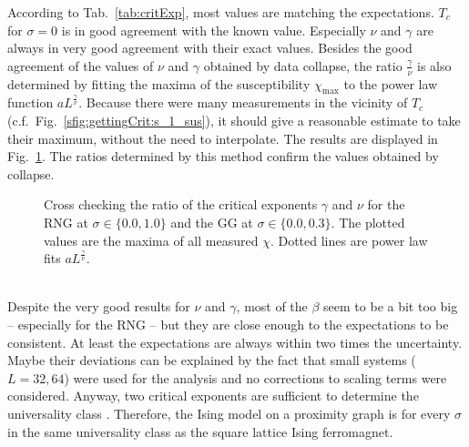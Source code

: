     According to Tab.\ \ref{tab:critExp}, most values
    are matching the expectations. \(T_c\) for \(\sigma = 0\) is in good
    agreement with the known value. Especially \(\nu\) and \(\gamma\)
    are always in very good agreement with their exact values. Besides the
    good agreement of the values of \(\nu\) and \(\gamma\) obtained by data collapse,
    the ratio \(\frac{\gamma}{\nu}\) is also determined by fitting the maxima of
    the susceptibility \(\chi_{\mathrm{max}}\) to the power law function \(aL^\frac{\gamma}{\nu}\).
    Because there were many measurements in the vicinity of \(T_c\)
    (c.f.\ Fig.\ \ref{sfig:gettingCrit:s_1_sus}), it should give a
    reasonable estimate to take their maximum, without the need to
    interpolate.
    The results are displayed in Fig.\ \ref{fig:susCrossCheck}. The ratios
    determined by this method confirm the values obtained by collapse.
    \begin{figure}[htbp]
        \centering
        \caption[Alternative Way Determining $\gamma / \nu$]
        {
            Cross checking the ratio of the critical exponents $\gamma$ and $\nu$ for
                 the RNG at $\sigma \in \{0.0, 1.0\}$ and
                 the GG at $\sigma \in \{0.0, 0.3\}$.
            The plotted values are the maxima of all measured \(\chi\).
            Dotted lines are power law fits \(aL^\frac{\gamma}{\nu}\).
        }
        \label{fig:susCrossCheck}
    \end{figure}\\
    Despite the very good results for \(\nu\) and \(\gamma\), most of the
    \(\beta\) seem to be a bit too big -- especially for the RNG -- but
    they are close enough to the expectations to be consistent. At least
    the expectations are always within two times the uncertainty.
    Maybe their deviations can be explained by the fact that small
    systems (\(L=32,64\)) were used for the analysis and no corrections
    to scaling terms were considered.
    Anyway, two critical exponents are sufficient to determine the
    universality class \cite[p. 145]{Katzgraber2011}. Therefore,
    the Ising model on a proximity graph is for every \(\sigma\) in the
    same universality class as the square lattice Ising ferromagnet.

